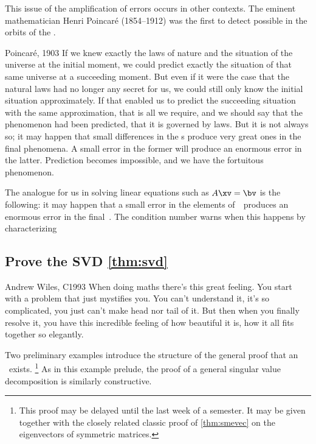This issue of the amplification of errors occurs in other contexts.
The eminent mathematician  Henri Poincar\'e (1854--1912) was the first to detect possible  in the orbits of the .
\begin{quoted}{Poincar\'e, 1903}
If we knew exactly the laws of nature and the situation of the universe at the initial moment, we could predict exactly the situation of that same universe at a succeeding moment.
But even if it were the case that the natural laws had no longer any secret for us, we could still only know the initial situation approximately. 
If that enabled us to predict the succeeding situation with the same approximation, that is all we require, and we should say that the phenomenon had been predicted, that it is governed by laws. 
But it is not always so; it may happen that small differences in the s produce very great ones in the final phenomena. 
A small error in the former will produce an enormous error in the latter. 
Prediction becomes impossible, and we have the fortuitous phenomenon.
\end{quoted}
The analogue for us in solving linear equations such as \(A\xv=\bv\) is the following: it may happen that a small error in the elements of~\bv\ produces an enormous error in the final~\xv.
The condition number warns when this happens by characterizing 






\subsection{Prove the SVD \cref{thm:svd}}
\label{sec:psvdt}


\begin{quoted}{Andrew Wiles, C1993}
When doing maths there's this great feeling.
You start with a problem that just mystifies you.
You can't understand it, it's so complicated, you just can't make head nor tail of it.
But then when you finally resolve it, you have this incredible feeling of how beautiful it is, how it all fits together so elegantly.
\end{quoted}


Two preliminary examples introduce the structure of the general proof that an \svd\ exists.  
\footnote{This proof may be delayed until the last week of a semester.
It may be given together with the closely related classic proof of \cref{thm:smevec} on the eigenvectors of symmetric matrices.}
As in this example prelude, the proof of a general singular value decomposition is similarly constructive.

